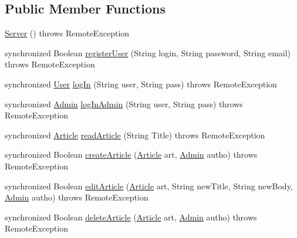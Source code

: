 \subsection*{Public Member Functions}
\begin{DoxyCompactItemize}
\item 
\hyperlink{classes_1_1deusto_1_1server_1_1_server_a84f78162a65dd737f224eb2f94c43023}{Server} ()  throws Remote\+Exception 
\item 
synchronized Boolean \hyperlink{classes_1_1deusto_1_1server_1_1_server_a0ab63e5bc49a52ff84f7d6859161b683}{register\+User} (String login, String password, String email)  throws Remote\+Exception 
\item 
synchronized \hyperlink{classes_1_1deusto_1_1server_1_1jdo_1_1_user}{User} \hyperlink{classes_1_1deusto_1_1server_1_1_server_a5a570da0fbfec7afdf56bd3648fc904f}{log\+In} (String user, String pass)  throws Remote\+Exception 
\item 
synchronized \hyperlink{classes_1_1deusto_1_1server_1_1jdo_1_1_admin}{Admin} \hyperlink{classes_1_1deusto_1_1server_1_1_server_a654d408d0865f8e3f2c931da9e90283a}{log\+In\+Admin} (String user, String pass)  throws Remote\+Exception 
\item 
synchronized \hyperlink{classes_1_1deusto_1_1server_1_1jdo_1_1_article}{Article} \hyperlink{classes_1_1deusto_1_1server_1_1_server_ac3af6f09e37d0b86743f8f46e39acdad}{read\+Article} (String Title)  throws Remote\+Exception 
\item 
synchronized Boolean \hyperlink{classes_1_1deusto_1_1server_1_1_server_a58363d9c2c5c5d1e085e22deeeebf833}{create\+Article} (\hyperlink{classes_1_1deusto_1_1server_1_1jdo_1_1_article}{Article} art, \hyperlink{classes_1_1deusto_1_1server_1_1jdo_1_1_admin}{Admin} autho)  throws Remote\+Exception 
\item 
synchronized Boolean \hyperlink{classes_1_1deusto_1_1server_1_1_server_a2c4455392fb9fb404d425110b5905c6a}{edit\+Article} (\hyperlink{classes_1_1deusto_1_1server_1_1jdo_1_1_article}{Article} art, String new\+Title, String new\+Body, \hyperlink{classes_1_1deusto_1_1server_1_1jdo_1_1_admin}{Admin} autho)  throws Remote\+Exception 
\item 
synchronized Boolean \hyperlink{classes_1_1deusto_1_1server_1_1_server_ad9d8810833b631866924dc481801614a}{delete\+Article} (\hyperlink{classes_1_1deusto_1_1server_1_1jdo_1_1_article}{Article} art, \hyperlink{classes_1_1deusto_1_1server_1_1jdo_1_1_admin}{Admin} autho)  throws Remote\+Exception 
\item 

\end{DoxyCompactItemize}
